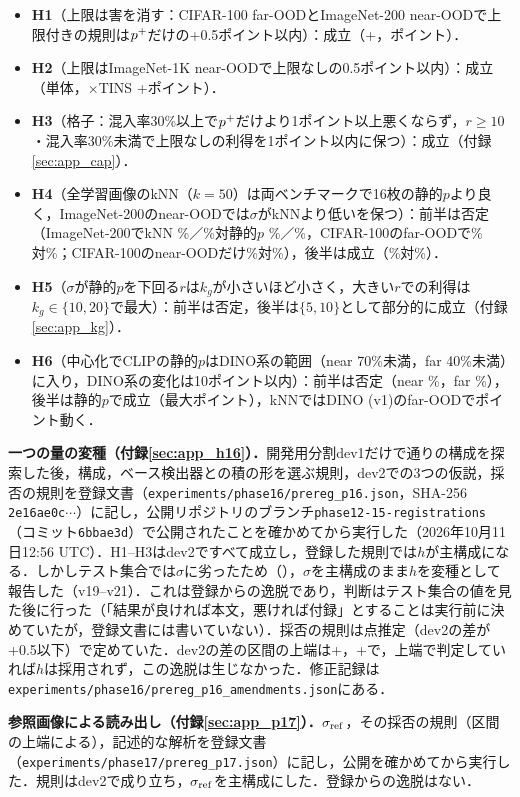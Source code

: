 \begin{itemize}
\item \textbf{H1}（上限は害を消す：CIFAR-100 far-OODとImageNet-200 near-OODで上限付きの規則は$p^{+}$だけの+0.5ポイント以内）：成立（+\NCifarStoreycFarDfprVsLp{}，\NInTwoZeroZeroStoreycNearDfprVsLp{}ポイント）．
\item \textbf{H2}（上限はImageNet-1K near-OODで上限なしの0.5ポイント以内）：成立（単体\NCapStoreycAloneNearDfprVsStorey{}，$\times$TINS +\NCapStoreycNearDfprVsStorey{}ポイント）．
\item \textbf{H3}（格子：混入率30\%以上で$p^{+}$だけより1ポイント以上悪くならず，$r\ge10$・混入率30\%未満で上限なしの利得を1ポイント以内に保つ）：成立（付録\ref{sec:app_cap}）．
\item \textbf{H4}（全学習画像のkNN（$k{=}50$）は両ベンチマークで16枚の静的$p$より良く，ImageNet-200のnear-OODでは$\sigma$がkNNより低い\FPR{}を保つ）：前半は否定（ImageNet-200でkNN \NInTwoZeroZeroKnnAllKFiveZeroNearFpr\%／\NInTwoZeroZeroKnnAllKFiveZeroFarFpr\%対静的$p$ \NInTwoZeroZeroStaticNearFpr\%／\NInTwoZeroZeroStaticFarFpr\%，CIFAR-100のfar-OODで\NCifarKnnAllKFiveZeroFarFpr\%対\NCifarStaticFarFpr\%；CIFAR-100のnear-OODだけ\NCifarKnnAllKFiveZeroNearFpr\%対\NCifarStaticNearFpr\%），後半は成立（\NInTwoZeroZeroMainNearFpr\%対\NInTwoZeroZeroKnnAllKFiveZeroNearFpr\%）．
\item \textbf{H5}（$\sigma$が静的$p$を下回る$r$は$k_g$が小さいほど小さく，大きい$r$での利得は$k_g\in\{10,20\}$で最大）：前半は否定，後半は$\{5,10\}$として部分的に成立（付録\ref{sec:app_kg}）．
\item \textbf{H6}（中心化でCLIPの静的$p$はDINO系の範囲（near 70\%未満，far 40\%未満）に入り，DINO系の変化は10ポイント以内）：前半は否定（near \NViewClipStaticcNearFpr\%，far \NViewClipStaticcFarFpr\%），後半は静的$p$で成立（最大\NViewsDinoCentredMaxabsFpr{}ポイント），kNNではDINO (v1)のfar-OODで\NViewsDinoKnncentredMaxabsFpr{}ポイント動く．
\end{itemize}

\textbf{一つの量の変種（付録\ref{sec:app_h16}）．}開発用分割dev1だけで\NHsExplNCfg{}通りの構成を探索した後，構成，ベース検出器との積の形を選ぶ規則，dev2での3つの仮説，採否の規則を登録文書（\texttt{experiments/phase16/prereg\_p16.json}，SHA-256 \texttt{2e16ae0c}$\cdots$）に記し，公開リポジトリのブランチ\texttt{phase12-15-registrations}（コミット\texttt{6bbae3d}）で公開されたことを確かめてから実行した（2026年10月11日12:56 UTC）．H1--H3はdev2ですべて成立し，登録した規則では$h$が主構成になる．しかしテスト集合では$\sigma$に劣ったため（），$\sigma$を主構成のまま$h$を変種として報告した（v19--v21）．これは登録からの逸脱であり，判断はテスト集合の値を見た後に行った（「結果が良ければ本文，悪ければ付録」とすることは実行前に決めていたが，登録文書には書いていない）．採否の規則は点推定（dev2の差が+0.5以下）で定めていた．dev2の差の区間の上端は+\NRHsUpperNear{}，+\NRHsUpperFar{}で，上端で判定していれば$h$は採用されず，この逸脱は生じなかった．修正記録は\texttt{experiments/phase16/prereg\_p16\_amendments.json}にある．

\textbf{参照画像による読み出し（付録\ref{sec:app_p17}）．}$\sigma_{\mathrm{ref}}$，その採否の規則（区間の上端による），記述的な解析を登録文書（\texttt{experiments/phase17/prereg\_p17.json}）に記し，公開を確かめてから実行した．規則はdev2で成り立ち，$\sigma_{\mathrm{ref}}$を主構成にした．登録からの逸脱はない．
